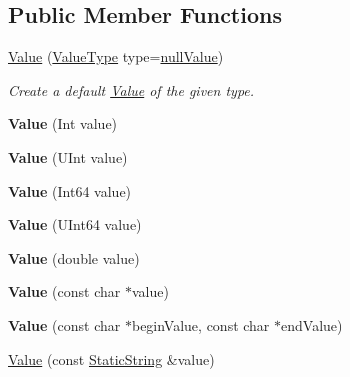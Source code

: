 \subsection*{Public Member Functions}
\begin{DoxyCompactItemize}
\item 
\mbox{\hyperlink{class_json_1_1_value_ada6ba1369448fb0240bccc36efaa46f7}{Value}} (\mbox{\hyperlink{namespace_json_a7d654b75c16a57007925868e38212b4e}{Value\+Type}} type=\mbox{\hyperlink{namespace_json_a7d654b75c16a57007925868e38212b4ea7d9899633b4409bd3fc107e6737f8391}{null\+Value}})
\begin{DoxyCompactList}\small\item\em Create a default \mbox{\hyperlink{class_json_1_1_value}{Value}} of the given type. \end{DoxyCompactList}\item 
\mbox{\label{class_json_1_1_value_a4744ae571fcf34f4b16a2257b3b3b585}} 
{\bfseries Value} (Int value)
\item 
\mbox{\label{class_json_1_1_value_ae67a857b01286e3499a87e95be848d20}} 
{\bfseries Value} (U\+Int value)
\item 
\mbox{\label{class_json_1_1_value_ab1cdc3d9a4d4cc03fa01439d43ceb1b5}} 
{\bfseries Value} (Int64 value)
\item 
\mbox{\label{class_json_1_1_value_a8adda58d5ae17bf7ca6a53bab4a7b69c}} 
{\bfseries Value} (U\+Int64 value)
\item 
\mbox{\label{class_json_1_1_value_a32228cc84d83200cca8441451997996c}} 
{\bfseries Value} (double value)
\item 
\mbox{\label{class_json_1_1_value_ad87b849356816aca75995dd07302e49d}} 
{\bfseries Value} (const char $\ast$value)
\item 
\mbox{\label{class_json_1_1_value_a13e567d467bb1e699d71e27a76b0e988}} 
{\bfseries Value} (const char $\ast$begin\+Value, const char $\ast$end\+Value)
\item 
\mbox{\hyperlink{class_json_1_1_value_a081830e95f88a37054da7e46c65b0766}{Value}} (const \mbox{\hyperlink{class_json_1_1_static_string}{Static\+String}} \&value)

\end{DoxyCompactItemize}

